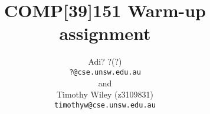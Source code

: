 \documentclass[12pt,a4paper]{scrartcl}
\begin{document}
\title{COMP[39]151 Warm-up assignment}
\author{Adi? ?(?) \\ 
        \texttt{?@cse.unsw.edu.au} \\ 
        and \\ 
        Timothy Wiley (z3109831) \\
        \texttt{timothyw@cse.unsw.edu.au} }

\maketitle



%
%
\end{document}
